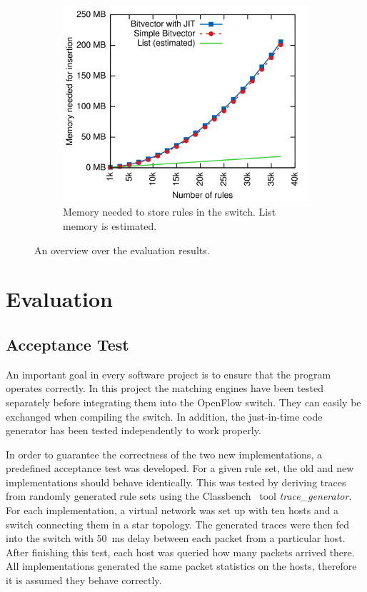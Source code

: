 \documentclass[conference]{IEEEtran}
\begin{document}
\begin{figure}
\begin{subfigure}{.32\linewidth}
        \label{fig:eval-times}
    \end{subfigure}
    ~
    \begin{subfigure}{.32\linewidth}
        \centering
        \includegraphics[width=\textwidth]{images/eval_mem}
        \caption{Memory needed to store rules in the switch. List memory is estimated.}
        \label{fig:eval-mem}
    \end{subfigure}
    \caption{An overview over the evaluation results.}
\end{figure}

\section{Evaluation}
\subsection{Acceptance Test}
An important goal in every software project is to ensure that the program operates correctly.
In this project the matching engines have been tested separately before integrating them into the OpenFlow switch.
They can easily be exchanged when compiling the switch.
In addition, the just-in-time code generator has been tested independently to work properly.

In order to guarantee the correctness of the two new implementations, a predefined acceptance test was developed.
For a given rule set, the old and new implementations should behave identically.
This was tested by deriving traces from randomly generated rule sets using 
the Classbench~\cite{classbench_website} tool \textit{trace\_generator}.
For each implementation, a virtual network was set up with ten hosts and a switch connecting them in a star topology.
The generated traces were then fed into the switch with 50\ ms delay between each packet from a particular host.
After finishing this test, each host was queried how many packets arrived there.
All implementations generated the same packet statistics on the hosts, therefore it is assumed they behave correctly.
\end{document}
